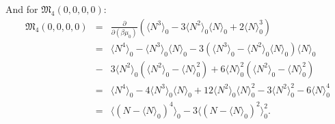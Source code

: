 And for $\mathfrak{M}_4(0,0,0,0):$
\begin{eqnarray}
	\mathfrak{M}_4(0,0,0,0) &=& \frac{\partial}{\partial(\beta\mu_0)}
	\left(\langle N^3 \rangle_0 - 3\langle N^2 \rangle_0\langle N \rangle_0 +2 \langle N \rangle_0^3\right) 
	\nonumber\\
	&=& \langle N^4 \rangle_0 - \langle N^3 \rangle_0\langle N \rangle_0 
	- 3\left(\langle N^3 \rangle_0 - \langle N^2 \rangle_0\langle N \rangle_0\right)\langle N \rangle_0
	\nonumber\\
	&-&3\langle N^2 \rangle_0 \left(\langle N^2 \rangle_0 - \langle N \rangle_0^2 \right)
	+ 6\langle N \rangle_0^2 \left(\langle N^2 \rangle_0 - \langle N \rangle_0^2\right)
	\nonumber\\
	&=& \langle N^4 \rangle_0 
	- 4\langle N^3 \rangle_0\langle N \rangle_0 
	+ 12\langle N^2 \rangle_0\langle N \rangle_0^2 
	- 3\langle N^2 \rangle_0^2 
	- 6\langle N \rangle_0^4
	\nonumber\\
	&=& \langle (N - \langle N \rangle_0)^4 \rangle_0 - 3 \langle (N - \langle N \rangle_0)^2 \rangle_0^2.
\end{eqnarray}
